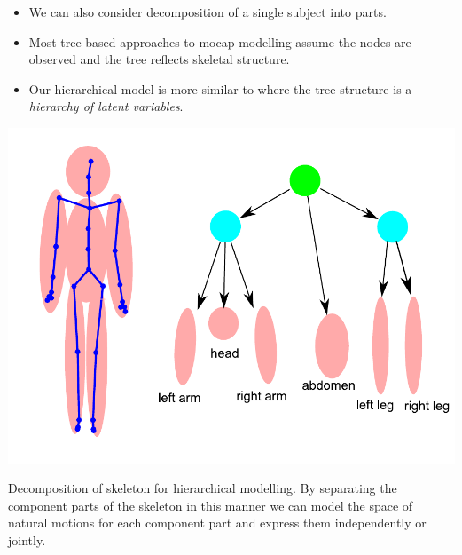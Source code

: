 \documentclass[english,color,smalltitle]{manchesterposter}
\begin{document}
\begin{multicols}{5}{\LARGE \par}
\begin{columnbox}
\end{columnbox}


\begin{columnbox}
\-


\begin{itemize}
\item We can also consider decomposition of a single subject into parts. {\large \par}
\item Most tree based approaches to mocap modelling assume the nodes are
observed and the tree reflects skeletal structure.{\large \par}
\item Our hierarchical model is more similar to \citep{Williams:tree98}
where the tree structure is a \emph{hierarchy of latent variables}. {\large \par}
\end{itemize}
\end{columnbox}


\begin{columnbox}
\-


%
\begin{minipage}[t][1\totalheight]{1\columnwidth}%
\begin{center}
\includegraphics[width=0.9\columnwidth]{./diagrams/stickHierarchy}
\par\end{center}{\LARGE \par}

\small Decomposition of skeleton for hierarchical modelling. By separating
the component parts of the skeleton in this manner we can model the
space of natural motions for each component part and express them
independently or jointly.\label{fig:skeletonDecomposition}%
\end{minipage}{\large \par}


\end{columnbox}
\end{multicols}
\end{document}

